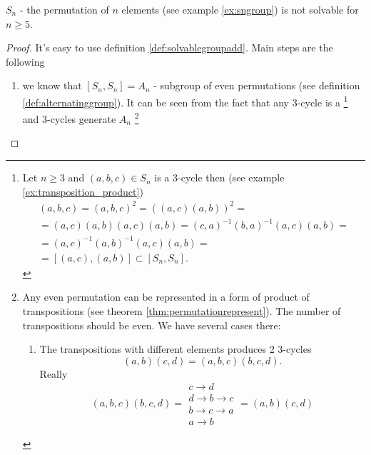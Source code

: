 \begin{theorem}[$S_n$ solvability]
  $S_n$ - the permutation of $n$ elements (see example
  \ref{ex:sngroup}) is not solvable for $n \ge 5$. 
  \begin{proof}
    It's easy to use definition \ref{def:solvablegroupadd}.
    Main steps are the following
    \begin{enumerate}
      \item we know that $\left[S_n, S_n\right] = A_n$ - subgroup of
        even permutations (see definition
        \ref{def:alternatinggroup}). It can be seen from the fact that
        any 3-cycle is a 
        \footnote{
          Let $n \ge 3$ and $(a,b,c) \in S_n$ is a 3-cycle then
          (see example \ref{ex:transposition_product})
          \begin{eqnarray}
            (a,b,c) = (a,b,c)^2 =
            \left((a,c)(a,b)\right)^2 =
            \nonumber \\
            = (a,c)(a,b)(a,c)(a,b) =
            (c,a)^{-1}(b,a)^{-1}(a,c)(a,b) =
            \nonumber \\
            =
            (a,c)^{-1}(a,b)^{-1}(a,c)(a,b) =
            \nonumber \\
            =
            \left[
              (a,c),(a,b)
              \right] \subset \left[S_n, S_n\right].
            \nonumber
          \end{eqnarray}
        }
        and 3-cycles
        generate $A_n$
        \footnote{
          \label{note:lec8_3cycle}
          Any even permutation can be represented in a form of product
          of transpositions (see theorem
          \ref{thm:permutationrepresent}). The number of
          transpositions should be 
          even. We have several cases there:
          \begin{enumerate}
            \item The transpositions with different elements produces
              2 3-cycles
              \[
              (a,b)(c,d) = (a,b,c)(b,c,d).
              \]
              Really
              \[
              (a,b,c)(b,c,d) = 
              \begin{array}{c}
                c \to d \\
                d \to b \to c \\
                b \to c \to a \\
                a \to b 
              \end{array} =
              (a,b)(c,d)
              \]

\end{enumerate}}
\end{enumerate}
\end{proof}
\end{theorem}
